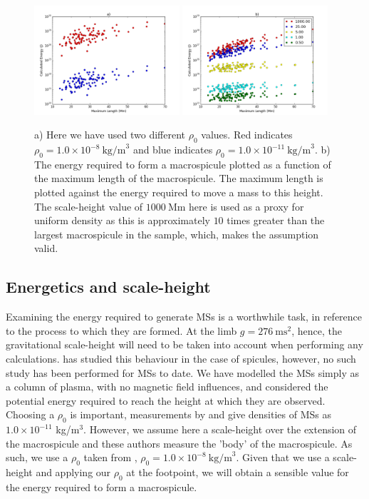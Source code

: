 \begin{figure}[h!]
	\centering
	\includegraphics[width=0.48\textwidth]{Chapter3/Figs/diff_rho0.pdf}
	\includegraphics[width=0.48\textwidth]{Chapter3/Figs/scale_h.pdf}
	\caption{\small a) Here we have used two different $\rho_0$ values. Red indicates $\rho_0 = 1.0 \times 10^{-8}\ \textrm{kg/m}^{3}$ and blue indicates $\rho_0 = 1.0 \times 10^{-11}\ \textrm{kg/m}^{3}$. b) The energy required to form a macrospicule plotted as a function of the maximum length of the macrospicule. The maximum length is plotted against the energy required to move a mass to this height. The scale-height value of $1000\ \textrm{Mm}$ here is used as a proxy for uniform density as this is approximately $10$ times greater than the largest macrospicule in the sample, which, makes the assumption valid.}
	\label{fig:scale_h}
\end{figure}

\subsection{Energetics and scale-height}
Examining the energy required to generate MSs is a worthwhile task, in reference to the process to which they are formed. At the limb $g = 276\ \textrm{ms}^2$, hence, the gravitational scale-height will need to be taken into account when performing any calculations. \cite{Pereira2012} has studied this behaviour in the case of spicules, however, no such study has been performed for MSs to date. We have modelled the MSs simply as a column of plasma, with no magnetic field influences, and considered the potential energy required to reach the height at which they are observed. Choosing a $\rho_0$ is important, measurements by \cite{Parenti2002} and \cite{Withbroe1976} give densities of MSs as $1.0 \times 10^{-11}$ kg/m$^{3}$. However, we assume here a scale-height over the extension of the macrospicule and these authors measure the 'body' of the macrospicule. As such, we use a $\rho_0$ taken from \cite{Vernazza1981}, $\rho_0 = 1.0 \times 10^{-8}\ \textrm{kg/m}^{3}$. Given that we use a scale-height and applying our $\rho_0$ at the footpoint, we will obtain a sensible value for the energy required to form a macrospicule.

